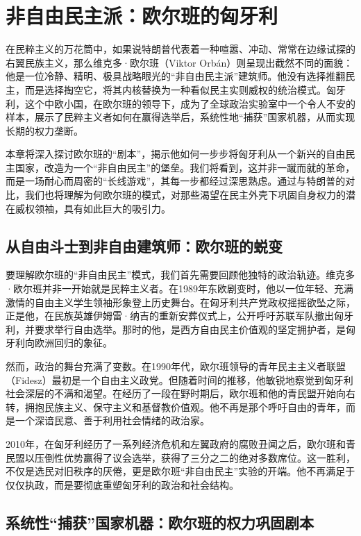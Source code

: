 \chapter{非自由民主派：欧尔班的匈牙利}

在民粹主义的万花筒中，如果说特朗普代表着一种喧嚣、冲动、常常在边缘试探的右翼民族主义，那么维克多·欧尔班（Viktor Orbán）则呈现出截然不同的面貌：他是一位冷静、精明、极具战略眼光的“非自由民主派”建筑师。他没有选择推翻民主，而是选择掏空它，将其内核替换为一种看似民主实则威权的统治模式。匈牙利，这个中欧小国，在欧尔班的领导下，成为了全球政治实验室中一个令人不安的样本，展示了民粹主义者如何在赢得选举后，系统性地“捕获”国家机器，从而实现长期的权力垄断。

本章将深入探讨欧尔班的“剧本”，揭示他如何一步步将匈牙利从一个新兴的自由民主国家，改造为一个“非自由民主”的堡垒。我们将看到，这并非一蹴而就的革命，而是一场耐心而周密的“长线游戏”，其每一步都经过深思熟虑。通过与特朗普的对比，我们也将理解为何欧尔班的模式，对那些渴望在民主外壳下巩固自身权力的潜在威权领袖，具有如此巨大的吸引力。

\section{从自由斗士到非自由建筑师：欧尔班的蜕变}

要理解欧尔班的“非自由民主”模式，我们首先需要回顾他独特的政治轨迹。维克多·欧尔班并非一开始就是民粹主义者。在1989年东欧剧变时，他以一位年轻、充满激情的自由主义学生领袖形象登上历史舞台。在匈牙利共产党政权摇摇欲坠之际，正是他，在民族英雄伊姆雷·纳吉的重新安葬仪式上，公开呼吁苏联军队撤出匈牙利，并要求举行自由选举。那时的他，是西方自由民主价值观的坚定拥护者，是匈牙利向欧洲回归的象征。

然而，政治的舞台充满了变数。在1990年代，欧尔班领导的青年民主主义者联盟（Fidesz）最初是一个自由主义政党。但随着时间的推移，他敏锐地察觉到匈牙利社会深层的不满和渴望。在经历了一段在野时期后，欧尔班和他的青民盟开始向右转，拥抱民族主义、保守主义和基督教价值观。他不再是那个呼吁自由的青年，而是一个深谙民意、善于利用社会情绪的政治家。

2010年，在匈牙利经历了一系列经济危机和左翼政府的腐败丑闻之后，欧尔班和青民盟以压倒性优势赢得了议会选举，获得了三分之二的绝对多数席位。这一胜利，不仅是选民对旧秩序的厌倦，更是欧尔班“非自由民主”实验的开端。他不再满足于仅仅执政，而是要彻底重塑匈牙利的政治和社会结构。

\section{系统性“捕获”国家机器：欧尔班的权力巩固剧本}

